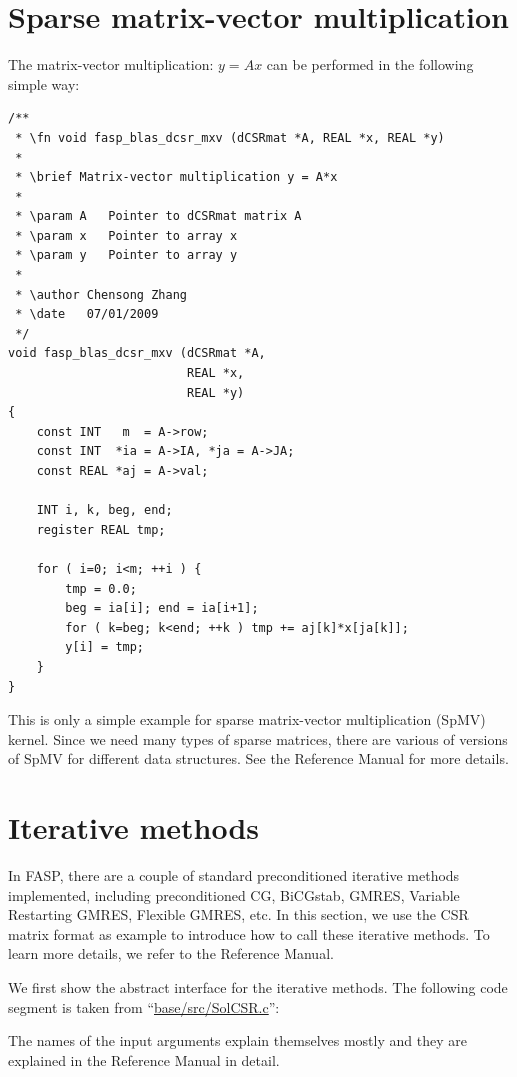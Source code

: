 \documentclass[11pt]{memoir}
\begin{document}
\section{Sparse matrix-vector multiplication}

The matrix-vector multiplication: $y=Ax$ can be performed in the
following simple way:
%
\begin{lstlisting}
/**
 * \fn void fasp_blas_dcsr_mxv (dCSRmat *A, REAL *x, REAL *y)
 *
 * \brief Matrix-vector multiplication y = A*x
 *
 * \param A   Pointer to dCSRmat matrix A
 * \param x   Pointer to array x
 * \param y   Pointer to array y
 *
 * \author Chensong Zhang
 * \date   07/01/2009
 */
void fasp_blas_dcsr_mxv (dCSRmat *A,
                         REAL *x,
                         REAL *y)
{
    const INT   m  = A->row;
    const INT  *ia = A->IA, *ja = A->JA;
    const REAL *aj = A->val;

    INT i, k, beg, end;
    register REAL tmp;

    for ( i=0; i<m; ++i ) {
        tmp = 0.0;
        beg = ia[i]; end = ia[i+1];
        for ( k=beg; k<end; ++k ) tmp += aj[k]*x[ja[k]];
        y[i] = tmp;
    }
}
\end{lstlisting}

This is only a simple example for sparse matrix-vector multiplication (SpMV) kernel. Since we need many types of sparse matrices, there are various of versions of SpMV for different data structures. See the Reference Manual for more details.

\section{Iterative methods}\label{sec:iter}

In FASP, there are a couple of standard preconditioned iterative methods~\cite{Saad.Saad.2003fv} implemented, including preconditioned CG, BiCGstab, GMRES, Variable Restarting GMRES, Flexible GMRES, etc. In this section, we use the CSR matrix format as example to introduce how to call these iterative methods. To learn more details, we refer to the Reference Manual.

We first show the abstract interface for the iterative methods. The following code segment is taken from ``\url{base/src/SolCSR.c}'':
%

%
The names of the input arguments explain themselves mostly and they are explained in the Reference Manual in detail.
\end{document}
